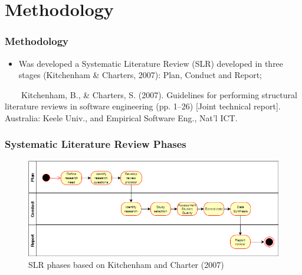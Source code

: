 \documentclass[10pt]{beamer}
\begin{document}
\section{Methodology}

\begin{frame}
	\frametitle{Methodology}
	\begin{itemize}
		\item Was developed a Systematic Literature Review (SLR) developed in three stages \footnotesize(Kitchenham \& Charters, 2007)\normalsize: Plan, Conduct and Report;

	\end{itemize}
	\tiny 
	~~~~Kitchenham, B., \& Charters, S. (2007). Guidelines for performing structural literature reviews in software engineering (pp. 1–26) [Joint technical report]. Australia: Keele Univ., and Empirical Software Eng., Nat’l ICT.\\

\end{frame}

\begin{frame}
	\frametitle{Systematic Literature Review Phases}
	\begin{figure}
		\includegraphics[scale=0.5]{../img/slr_phases.png}
		\caption{SLR phases based on Kitchenham and Charter (2007)}
		\label{figure1}
	\end{figure}
\end{frame}
\end{document}
